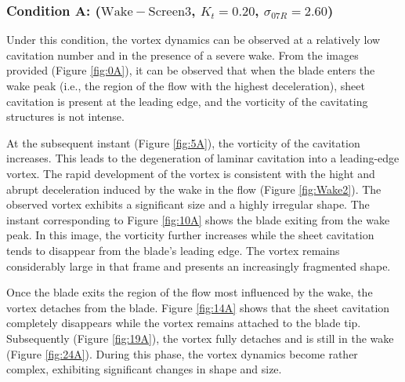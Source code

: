 \subsubsection{Condition A: ($\mathrm{Wake-Screen3}$, $K_t = 0.20$, $\sigma_{07R} = 2.60$)}
\label{sez:A}

Under this condition, the vortex dynamics can be observed at a relatively low cavitation number and in the presence of a severe wake.
From the images provided (Figure \ref{fig:0A}), it can be observed that when the blade enters the wake peak (i.e., the region of the flow with the highest deceleration), sheet cavitation is present at the leading edge, and the vorticity of the cavitating structures is not intense.

At the subsequent instant (Figure \ref{fig:5A}), the vorticity of the cavitation increases. This leads to the degeneration of laminar cavitation into a leading-edge vortex. The rapid development of the vortex is consistent with the hight and abrupt deceleration induced by the wake in the flow (Figure \ref{fig:Wake2}). The observed vortex exhibits a significant size and a highly irregular shape.
The instant corresponding to Figure \ref{fig:10A} shows the blade exiting from the wake peak. In this image, the vorticity further increases while the sheet cavitation tends to disappear from the blade's leading edge. The vortex remains considerably large in that frame and presents an increasingly fragmented shape.

Once the blade exits the region of the flow most influenced by the wake, the vortex detaches from the blade. Figure \ref{fig:14A} shows that the sheet cavitation completely disappears while the vortex remains attached to the blade tip. Subsequently (Figure \ref{fig:19A}), the vortex fully detaches and is still in the wake (Figure \ref{fig:24A}). During this phase, the vortex dynamics become rather complex, exhibiting significant changes in shape and size.

